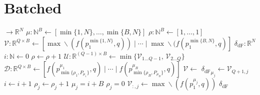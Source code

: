\section{Batched}
\begin{algorithm}
    \caption{Batched}
    \begin{algorithmic}[1]
         $\to \mathbb{R}^N$
            \Statex
            \State $\mu: \mathbb{N}^B \gets [\min\{1, N\}, \ldots, \min\{B, N\}]$
            \State $\rho: \mathbb{N}^B \gets [1, \ldots, 1]$
            \Statex
            \State $\mathcal{V}: \mathbb{R}^{Q \times B} \gets [\max\!\backslash(f(p^{\min\{1, N\}}_1, q)) \;|\; \cdots \;|\; \max\!\backslash(f(p^{\min\{B, N\}}_1, q)]$ 
            \Statex
            \State $\delta_\mathrm{dF}: \mathbb{R}^N$
            \State $i: \mathbb{N} \gets 0$
                    \State $\rho \gets \rho + 1$
                    \Statex
                    \State $\mathcal{U}: \mathbb{R}^{(Q - 1) \times B} \gets \min\{ \mathcal{V}_{1 \ldots Q-1},\, \mathcal{V}_{2 \ldots Q} \}$
                    \State $\mathcal{D}: \mathbb{R}^{Q \times B} \gets [f(p^{\mu_1}_{\min\{\rho_1, P_{\mu_1}\}}, q) \;|\; \cdots \;|\; f(p^{\mu_B}_{\min\{\rho_B, P_{\mu_B}\}}, q)]$
                    \State $\mathcal{V} \gets$ 
                \EndWhile
                \Statex
                    \State ${\delta_\mathrm{dF}}_{\mu_j} \gets \mathcal{V}_{Q+1,j}$
                    \State $i \gets i + 1$
                    \Statex
                    \State $\rho_j \gets \rho_j + 1$
                        \State $\mu_j = i + B$
                        \State $\rho_j = 0$
                        \Statex
                        \State $\mathcal{V}_{:,j} \gets \max\!\backslash(f(p^{\mu_j}_1, q))$ 
                    \EndIf
                \EndFor
            \EndWhile
            \Statex
            \State \Return $\delta_\mathrm{dF}$
        \EndFunction
    \end{algorithmic}
\end{algorithm}

